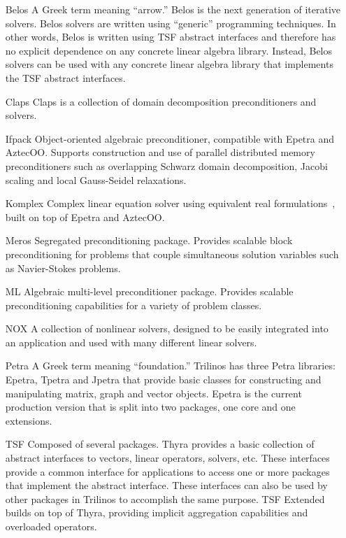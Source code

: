 \begin{itemize}
\item[Belos] A Greek term meaning ``arrow.'' Belos is the next
generation of iterative solvers.  Belos solvers are written using
``generic'' programming techniques.  In other words, Belos is written
using TSF abstract interfaces and therefore has no explicit dependence
on any concrete linear algebra library.  Instead, Belos solvers can be
used with any concrete linear algebra library that implements the TSF
abstract interfaces. 

\item[Claps]
Claps is a collection of domain decomposition preconditioners and
solvers.

\item[Ifpack] 
Object-oriented algebraic preconditioner, compatible with 
Epetra and AztecOO.  Supports construction and use of parallel
distributed memory preconditioners such as overlapping Schwarz domain
decomposition, Jacobi scaling and local Gauss-Seidel relaxations.

\item[Komplex] 
Complex linear equation solver using equivalent real 
formulations~\cite{DayHero2000}, built on top of Epetra and AztecOO.

\item[Meros]
Segregated preconditioning package.  Provides scalable block
preconditioning for problems that couple simultaneous solution
variables such as Navier-Stokes problems.

\item[ML]
Algebraic multi-level preconditioner package.  Provides scalable
preconditioning capabilities for a variety of problem classes.

\item[NOX]
A collection of nonlinear solvers, designed to be easily integrated
into an application and used with many different linear solvers.

\item[Petra]
A Greek term meaning ``foundation.''  Trilinos has three Petra 
libraries: Epetra, Tpetra and Jpetra that provide basic classes 
for constructing and manipulating matrix, graph and vector
objects.  Epetra is the current production version that is
split into two packages, one core and one extensions.

\item[TSF]
Composed of several packages.  Thyra provides 
a basic collection of abstract interfaces to vectors, linear
operators, solvers, etc.  These interfaces provide a common
interface for applications to access one or more packages that
implement the abstract interface.  These interfaces can also be used
by other packages in Trilinos to accomplish the same purpose.
TSF Extended builds on top of Thyra, providing implicit
aggregation capabilities and overloaded operators.

\end{itemize}

